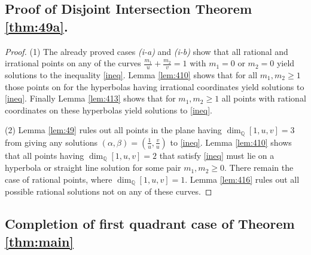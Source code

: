 \documentclass[12pt,letterpaper, reqno]{amsart}
\theoremstyle{definition}
\theoremstyle{remark}
\newcommand{\QQ}{\mathbb{Q}}
\begin{document}
\subsection{ {\bf Proof of Disjoint Intersection Theorem \ref{thm:49a}.}}\label{sec445}


\begin{proof}
(1) The already proved cases {\it (i-a)} and {\it (i-b)} show that all rational and irrational points
on any of the curves 
$\frac{m_1}{u} + \frac{m_2}{v} =1$  with $m_1=0$ or
$m_2=0$  yield solutions to the inequality \eqref{ineq}. 
Lemma  \ref{lem:410} shows that for all $m_1, m_2 \ge 1$ 
those  points on  for the hyperbolas 
having irrational coordinates yield solutions to \eqref{ineq}.
Finally Lemma \ref{lem:413}  shows that for $m_1, m_2 \ge 1$ 
all points with rational coordinates on these hyperbolas  
 yield solutions to \eqref{ineq}.

(2) Lemma \ref{lem:49} rules out all points in the plane having 
$\dim_{\QQ} [1, u, v]=3$ from giving any solutions $(\alpha, \beta)= (\frac{1}{u}, \frac{v}{u})$  to \eqref{ineq}.
Lemma \ref{lem:410} shows that all points having $\dim_{\QQ} [1, u, v]=2$
that satisfy \eqref{ineq} must lie on a hyperbola or straight line solution for
some pair $m_1, m_2 \ge 0$. There remain the case of rational points,
where $\dim_{\QQ} [1, u, v]=1$.
Lemma \ref{lem:416} rules out all possible 
rational solutions not on any of these curves.
\end{proof} 

%
%
\subsection{Completion of first quadrant case of Theorem \ref{thm:main}}\label{sec:45}
\end{document}
